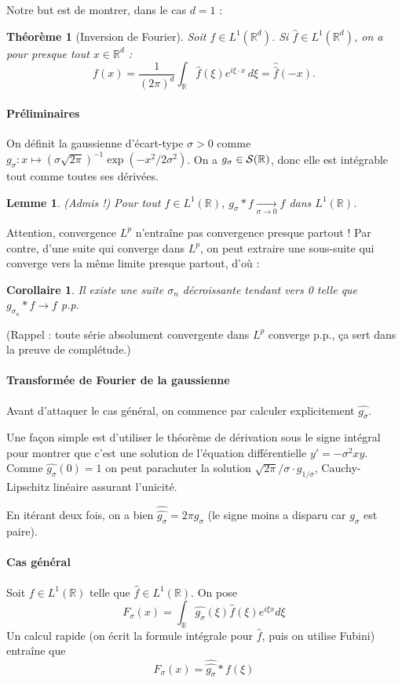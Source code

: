 \documentclass[a4paper, 11pt]{article}
\def\R{\mathbb{R}}
\def\S{{\cal{S}}}
\newtheorem*{theorem}{Théorème}
\newtheorem*{lemma}{Lemme}
\newtheorem*{corollary}{Corollaire}
\begin{document}
Notre but est de montrer, dans le cas $d = 1$ :

\begin{theorem}[Inversion de Fourier]
  Soit $f \in L^1(\R^d)$. Si $\hat{f} \in L^1(\R^d)$, on a pour presque
  tout $x \in \R^d$ :
\[ f(x) = \frac{1}{(2\pi)^d} \int_\R \hat{f}(\xi) e^{i\xi \cdot x} \,d\xi =
  \hat{\hat{f}}(-x). \]
\end{theorem}

\paragraph{Préliminaires}
On définit la gaussienne d'écart-type $\sigma > 0$ comme $g_\sigma : x \mapsto
(\sigma\sqrt{2\pi})^{-1}\exp(-x^2/2\sigma^2)$. On a $g_\sigma \in \S(\R)$, donc
elle est intégrable tout comme toutes ses dérivées.

\begin{lemma}
  (Admis !) Pour tout $f \in L^1(\R)$, $g_\sigma * f
  \underset{\sigma \to 0}{\longrightarrow} f$ dans $L^1(\R)$.
\end{lemma}
Attention, convergence $L^p$ n'entraîne pas convergence presque partout ! Par
contre, d'une suite qui converge dans $L^p$, on peut extraire une sous-suite qui
converge vers la même limite presque partout, d'où :
\begin{corollary}
  Il existe une suite $\sigma_n$ décroissante tendant vers 0 telle que
  $g_{\sigma_n} * f \rightarrow f$ p.p.
\end{corollary}
(Rappel : toute série absolument convergente dans $L^p$ converge p.p., ça
sert dans la preuve de complétude.)

\paragraph{Transformée de Fourier de la gaussienne}
Avant d'attaquer le cas général, on commence par calculer explicitement
$\widehat{g_\sigma}$.

Une façon simple est d'utiliser le théorème de dérivation
sous le signe intégral pour montrer que c'est une solution de l'équation
différentielle $y' = -\sigma^2xy $. Comme $\widehat{g_\sigma}(0) = 1$ on peut
parachuter la solution $\sqrt{2\pi}/\sigma \cdot g_{1/\sigma}$, Cauchy-Lipschitz
linéaire assurant l'unicité.

En itérant deux fois, on a bien $\widehat{\widehat{g_{\sigma}}} = 2\pi g_\sigma$
(le signe moins a disparu car $g_\sigma$ est paire).

\paragraph{Cas général} Soit $f \in L^1(\R)$ telle que $\hat{f} \in L^1(\R)$. On
pose
\[ F_\sigma(x) = \int_\R \widehat{g_\sigma}(\xi)\hat{f}(\xi)e^{i\xi x} d\xi \]
Un calcul rapide (on écrit la formule intégrale pour $\hat{f}$, puis on utilise
Fubini) entraîne que
\[ F_\sigma(x) = \widehat{\widehat{g_\sigma}} * f(\xi) \]
\end{document}
